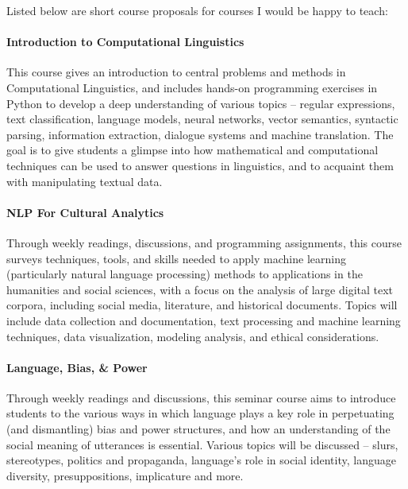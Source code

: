 \documentclass[11pt, letterpaper]{practical-report}
\begin{document}
Listed below are short course proposals for courses I would be happy to teach:

\paragraph{Introduction to Computational Linguistics}  This course gives an introduction to central problems and methods in Computational Linguistics, and includes hands-on programming exercises in Python to develop a deep understanding of various topics -- regular expressions, text classification, language models, neural networks, vector semantics, syntactic parsing, information extraction, dialogue systems and machine translation. The goal is to give students a glimpse into how mathematical and computational techniques can be used to answer questions in linguistics, and to acquaint them with manipulating textual data.

\paragraph{NLP For Cultural Analytics} Through weekly readings, discussions, and programming assignments, this course surveys techniques, tools, and skills needed to apply machine learning (particularly natural language processing) methods to applications in the humanities and social sciences, with a focus on the analysis of large digital text corpora, including social media, literature, and historical documents. Topics will include data collection and documentation, text processing and machine learning techniques, data visualization, modeling analysis, and ethical considerations.

\paragraph{Language, Bias, \& Power} Through weekly readings and discussions, this seminar course aims to introduce students to the various ways in which language plays a key role in perpetuating (and dismantling) bias and power structures, and how an understanding of the social meaning of utterances is essential. Various topics will be discussed -- slurs, stereotypes, politics and propaganda, language's role in social identity, language diversity, presuppositions, implicature and more.
\end{document}
